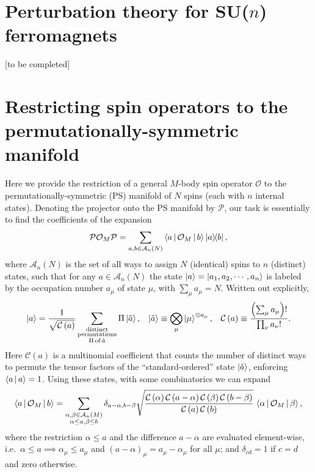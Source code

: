 \documentclass[nofootinbib,twocolumn]{revtex4-2}
\renewcommand{\t}{\text} %
\newcommand{\f}[2]{\dfrac{#1}{#2}} %
\newcommand{\p}[1]{\left(#1\right)} %
\newcommand{\bk}{\Braket} %
\newcommand{\1}{\mathds{1}}
\newcommand{\A}{\mathcal{A}}
\newcommand{\C}{\mathcal{C}}
\renewcommand{\O}{\mathcal{O}}
\renewcommand{\P}{\mathcal{P}}
\newcommand{\red}[1]{{\color{red} #1}}
\begin{document}
\section{Perturbation theory for SU($n$) ferromagnets}
\label{sec:pert_theory}

\red{[to be completed]}

\section{Restricting spin operators to the permutationally-symmetric manifold}
\label{sec:PS_ops}

Here we provide the restriction of a general $M$-body spin operator $\O$ to the permutationally-symmetric (PS) manifold of $N$ spins (each with $n$ internal states).
Denoting the projector onto the PS manifold by $\P$, our task is essentially to find the coefficients of the expansion
\begin{align}
  \P \O_M \P = \sum_{a,b\in\A_n\p{N}} \bk{a|\O_M|b} \op{a}{b},
\end{align}
where $\A_n\p{N}$ is the set of all ways to assign $N$ (identical) spins to $n$ (distinct) states, such that for any $a\in\A_n\p{N}$ the state $\ket{a}=\ket{a_1,a_2,\cdots,a_n}$ is labeled by the occupation number $a_\mu$ of state $\mu$, with $\sum_\mu a_\mu=N$.
Written out explicitly,
\begin{align}
  \ket{a} = \f1{\sqrt{\C\p{a}}}
  \sum_{\substack{\t{distinct}\\\t{permutations}\\\Pi\,\t{of}\,\tilde a}}
  \Pi\ket{\tilde a},
  &&
  \ket{\tilde a} \equiv \bigotimes_\mu \ket{\mu}^{\otimes a_\mu},
  &&
  \C\p{a} \equiv \f{\p{\sum_\mu a_\mu}!}{\prod_\nu a_\nu!}.
\end{align}
Here $\C\p{a}$ is a multinomial coefficient that counts the number of distinct ways to permute the tensor factors of the ``standard-ordered'' state $\ket{\tilde a}$, enforcing $\bk{a|a}=1$.
Using these states, with some combinatorics we can expand
\begin{align}
  \bk{a|\O_M|b} =
  \sum_{\substack{\alpha,\beta\in\A_n\p{M}\\\alpha\le a,\beta\le b}}
  \delta_{a-\alpha,b-\beta}
  \sqrt{\f{\C\p{\alpha}\C\p{a-\alpha}\C\p{\beta}\C\p{b-\beta}}
    {\C\p{a}\C\p{b}}}
  \, \bk{\alpha|\O_M|\beta},
  \label{eq:multi_body_eval}
\end{align}
where the restriction $\alpha\le a$ and the difference $a-\alpha$ are evaluated element-wise, i.e.~$\alpha\le a\implies\alpha_\mu\le a_\mu$ and $\p{a-\alpha}_\mu=a_\mu-\alpha_\mu$ for all $\mu$; and $\delta_{cd}=1$ if $c=d$ and zero otherwise.
\end{document}
